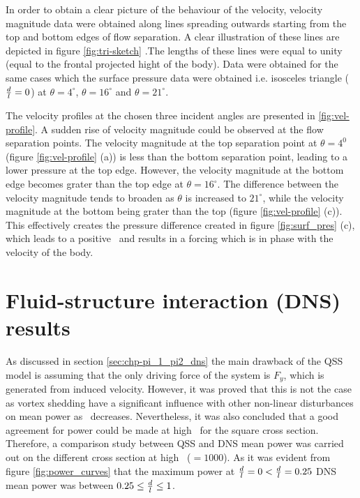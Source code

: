 In order to obtain a clear picture of the behaviour of the velocity, velocity magnitude data were obtained along lines spreading outwards starting from the top and bottom edges of flow separation. A clear illustration of these lines are depicted in figure \ref{fig:tri-sketch} .The lengths of these lines were equal to unity (equal to the frontal projected hight of the body). Data were obtained for the same cases which the surface pressure data were obtained i.e. isosceles triangle ($\frac{d}{l}=0$) at $\theta=4^{\circ}$, $\theta=16^{\circ}$ and $\theta=21^{\circ}$.



The velocity profiles at the chosen three incident angles are presented in \ref{fig:vel-profile}. A sudden rise of velocity magnitude could be observed at the flow separation points. The velocity magnitude at the top separation point  at $\theta= 4^{0}$ (figure \ref{fig:vel-profile} (a)) is less than the bottom separation point, leading to a lower pressure at the top edge. However, the velocity magnitude at the bottom edge becomes grater than the top edge at $\theta=16^{\circ}$. The difference between the velocity magnitude tends to broaden as $\theta$ is increased to $21^{\circ}$, while the velocity magnitude at the bottom being grater than the top (figure \ref{fig:vel-profile} (c)). This effectively creates the pressure difference created in figure \ref{fig:surf_pres} (c), which leads to a positive \cy\ and results in a forcing which is in phase with the velocity of the body.  


\section{Fluid-structure interaction (DNS) results}

As discussed in section \ref{sec:chp-pi_1_pi2_dns} the main drawback of the QSS model is assuming that the only driving force of the system is $F_{y}$, which is generated from induced velocity. However, it was proved that this is not the case as vortex shedding have a significant influence with other non-linear disturbances on mean power as \massstiff\ decreases. Nevertheless, it was also concluded that a good agreement for power could be made at high \massstiff\ for the square cross section. Therefore, a comparison study between QSS and DNS mean power was carried out on the different cross section at high \massstiff\ ($=1000$). As it was evident from figure \ref{fig:power_curves} that the maximum power at $\frac{d}{l}=0 < \frac{d}{l}=0.25$ DNS mean power was  between $0.25\leq\frac{d}{l}\leq1$. 

